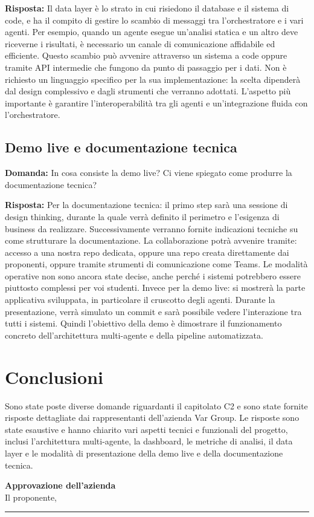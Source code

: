 \documentclass[a4paper,12pt]{article}
\begin{document}
{    \textbf{Risposta:} Il data layer è lo strato in cui risiedono il database e il sistema di code, e ha il compito di gestire lo scambio di messaggi tra l'orchestratore e i vari agenti. Per esempio, quando un agente esegue un'analisi statica e un altro deve riceverne i risultati, è necessario un canale di comunicazione affidabile ed efficiente. Questo scambio può avvenire attraverso un sistema a code oppure tramite API intermedie che fungono da punto di passaggio per i dati. Non è richiesto un linguaggio specifico per la sua implementazione: la scelta dipenderà dal design complessivo e dagli strumenti che verranno adottati. L'aspetto più importante è garantire l'interoperabilità tra gli agenti e un'integrazione fluida con l'orchestratore.

    \newpage
    \subsection{Demo live e documentazione tecnica}
    \textbf{Domanda:} In cosa consiste la demo live? Ci viene spiegato come produrre la documentazione tecnica?

    \textbf{Risposta:} Per la documentazione tecnica: il primo step sarà una sessione di design thinking, durante la quale verrà definito il perimetro e l'esigenza di business da realizzare. Successivamente verranno fornite indicazioni tecniche su come strutturare la documentazione. La collaborazione potrà avvenire tramite: accesso a una nostra repo dedicata, oppure una repo creata direttamente dai proponenti, oppure tramite strumenti di comunicazione come Teams. Le modalità operative non sono ancora state decise, anche perché i sistemi potrebbero essere piuttosto complessi per voi studenti. Invece per la demo live: si mostrerà la parte applicativa sviluppata, in particolare il cruscotto degli agenti. Durante la presentazione, verrà simulato un commit e sarà possibile vedere l'interazione tra tutti i sistemi. Quindi l'obiettivo della demo è dimostrare il funzionamento concreto dell'architettura multi-agente e della pipeline automatizzata.
}

\section{Conclusioni}{
    Sono state poste diverse domande riguardanti il capitolato C2 e sono state fornite risposte dettagliate dai rappresentanti dell'azienda Var Group. Le risposte sono state esaustive e hanno chiarito vari aspetti tecnici e funzionali del progetto, inclusi l'architettura multi-agente, la dashboard, le metriche di analisi, il data layer e le modalità di presentazione della demo live e della documentazione tecnica.
}

\vspace{2cm}
\begin{flushright}
    \textbf{Approvazione dell'azienda} \\
    Il proponente,\\[0.5cm]
    \rule{6cm}{0.4pt}\\
\end{flushright}
\end{document}
